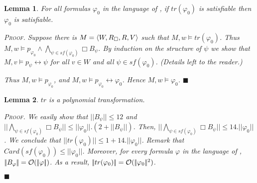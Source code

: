 \documentclass{article}
\newtheorem{lemma}{Lemma}
\newenvironment{pf}{\em \medskip\noindent \textsc{Proof.}}
{\hspace*{\fill}\nolinebreak[2]\hspace*{\fill}$\blacksquare$\medskip}
\renewcommand{\phi}{\varphi}
\newcommand{\card}[1]{\mathit{Card}(#1)}           \newcommand{\ext}[1]{|#1|}
\newcommand{\eqv}{\leftrightarrow}      \newcommand{\imp}{\rightarrow}          \newcommand{\subfml}{\mathit{sf}}
\newcommand{\lngth}[1]{|\!|#1|\!|}
\begin{document}
\begin{lemma}\label{lem:trdsat2csat}
For all formulas $\phi_0 $ in the language of \DSTIT,
if   $tr(\phi_0) $ is satisfiable
then $   \phi_0  $ is satisfiable.

\begin{pf}
Suppose there is $M = \langle W,R_\Box,R,V \rangle $
such that  $M,w \models tr(\phi_0) $. Thus
$M,w \models p_{\phi_0} \land \bigwedge_{\psi \in \subfml(\phi_0)} \Box B_\psi $.
By induction on the structure of $\psi$ we show that
$M,v \models p_\psi \eqv \psi $
for all $v \in W$ and all $\psi \in \subfml(\phi_0) $.
(Details left to the reader.)

Thus  $M,w \models p_{\phi_0} $, and $M,w \models p_{\phi_0} \eqv \phi_0 $.
Hence $M,w \models    \phi_0  $.
\end{pf}
\end{lemma}


\begin{lemma}
$tr$ is a polynomial transformation.

\begin{pf}
We easily show that $\lngth{B_\psi} \leq 12$ and
$\lngth{ \bigwedge_{\psi \in \subfml(\phi_0)} \Box B_\psi }
\leq
\lngth{\phi_0} . (2+\lngth{B_\psi})$.
Then, $\lngth{\bigwedge_{\psi \in \subfml(\phi_0)}\Box B_\psi} \leq
14.\lngth{\phi_0} $.
We conclude that $\lngth{tr(\phi_0)}  \leq 1+14.\lngth{\phi_0}$.
Remark that $\card{\subfml(\phi_0)} \leq \lngth{\phi_0} $.
Moreover, for every formula $\phi$ in the language of \CSTIT,
$\lngth{B_\phi} = {\cal O}(\lngth{\phi}) $.
As a result,
$\lngth{tr(\phi_0)} = {\cal O}(\lngth{\phi_0}^2) $.

\end{pf}
\end{lemma}
\end{document}

